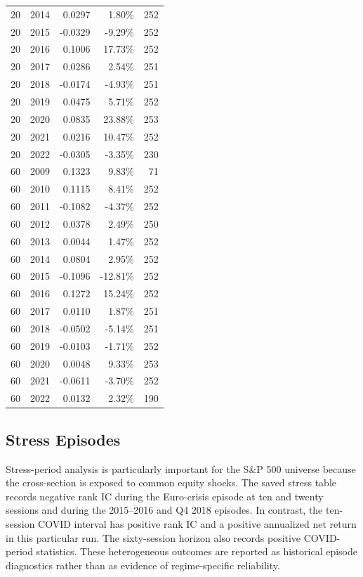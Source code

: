 \documentclass[10pt]{article}
\begin{document}
\begin{longtable}{rrr r r}
20 & 2014 & 0.0297 & 1.80\% & 252 \\
20 & 2015 & -0.0329 & -9.29\% & 252 \\
20 & 2016 & 0.1006 & 17.73\% & 252 \\
20 & 2017 & 0.0286 & 2.54\% & 251 \\
20 & 2018 & -0.0174 & -4.93\% & 251 \\
20 & 2019 & 0.0475 & 5.71\% & 252 \\
20 & 2020 & 0.0835 & 23.88\% & 253 \\
20 & 2021 & 0.0216 & 10.47\% & 252 \\
20 & 2022 & -0.0305 & -3.35\% & 230 \\
60 & 2009 & 0.1323 & 9.83\% & 71 \\
60 & 2010 & 0.1115 & 8.41\% & 252 \\
60 & 2011 & -0.1082 & -4.37\% & 252 \\
60 & 2012 & 0.0378 & 2.49\% & 250 \\
60 & 2013 & 0.0044 & 1.47\% & 252 \\
60 & 2014 & 0.0804 & 2.95\% & 252 \\
60 & 2015 & -0.1096 & -12.81\% & 252 \\
60 & 2016 & 0.1272 & 15.24\% & 252 \\
60 & 2017 & 0.0110 & 1.87\% & 251 \\
60 & 2018 & -0.0502 & -5.14\% & 251 \\
60 & 2019 & -0.0103 & -1.71\% & 252 \\
60 & 2020 & 0.0048 & 9.33\% & 253 \\
60 & 2021 & -0.0611 & -3.70\% & 252 \\
60 & 2022 & 0.0132 & 2.32\% & 190 \\
\bottomrule
\end{longtable}
\endgroup

\subsection{Stress Episodes}

Stress-period analysis is particularly important for the S\&P 500 universe because the cross-section is exposed to common equity shocks. The saved stress table records negative rank IC during the Euro-crisis episode at ten and twenty sessions and during the 2015--2016 and Q4 2018 episodes. In contrast, the ten-session COVID interval has positive rank IC and a positive annualized net return in this particular run. The sixty-session horizon also records positive COVID-period statistics. These heterogeneous outcomes are reported as historical episode diagnostics rather than as evidence of regime-specific reliability.
\end{document}

